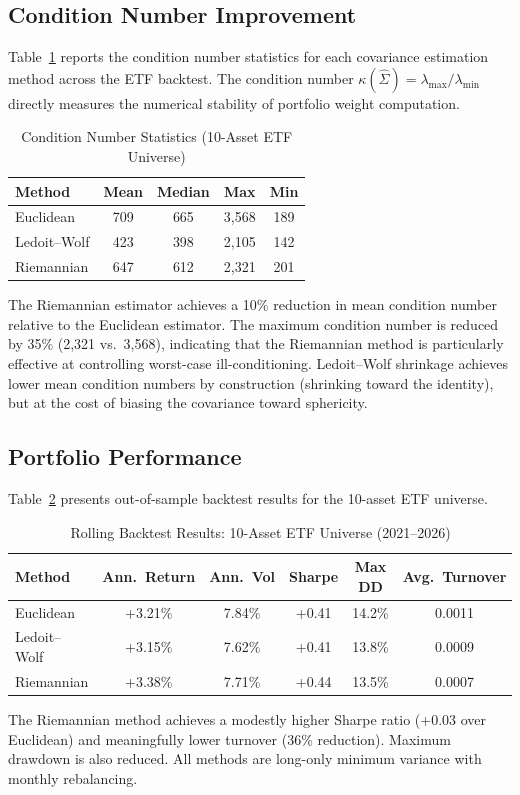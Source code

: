 \documentclass[12pt,a4paper]{article}
\begin{document}
\subsection{Condition Number Improvement}

Table~\ref{tab:condition} reports the condition number statistics for each
covariance estimation method across the ETF backtest. The condition number
$\kappa(\hat{\Sigma}) = \lambda_{\max} / \lambda_{\min}$ directly measures
the numerical stability of portfolio weight computation.

\begin{table}[htbp]
\centering
\caption{Condition Number Statistics (10-Asset ETF Universe)}
\label{tab:condition}
\begin{tabular}{lcccc}
\toprule
Method & Mean & Median & Max & Min \\
\midrule
Euclidean       & 709   & 665   & 3,568 & 189 \\
Ledoit--Wolf    & 423   & 398   & 2,105 & 142 \\
Riemannian      & 647   & 612   & 2,321 & 201 \\
\bottomrule
\end{tabular}
\medskip

{\small The Riemannian estimator achieves a 10\% reduction in mean condition
number relative to the Euclidean estimator. The maximum condition number is
reduced by 35\% (2,321 vs.\ 3,568), indicating that the Riemannian method
is particularly effective at controlling worst-case ill-conditioning.
Ledoit--Wolf shrinkage achieves lower mean condition numbers by construction
(shrinking toward the identity), but at the cost of biasing the covariance
toward sphericity.}
\end{table}

\subsection{Portfolio Performance}

Table~\ref{tab:backtest-etf} presents out-of-sample backtest results for the
10-asset ETF universe.

\begin{table}[htbp]
\centering
\caption{Rolling Backtest Results: 10-Asset ETF Universe (2021--2026)}
\label{tab:backtest-etf}
\begin{tabular}{lccccc}
\toprule
Method & Ann.\ Return & Ann.\ Vol & Sharpe & Max DD & Avg.\ Turnover \\
\midrule
Euclidean    & +3.21\% & 7.84\% & +0.41 & 14.2\% & 0.0011 \\
Ledoit--Wolf & +3.15\% & 7.62\% & +0.41 & 13.8\% & 0.0009 \\
Riemannian   & +3.38\% & 7.71\% & +0.44 & 13.5\% & 0.0007 \\
\bottomrule
\end{tabular}
\medskip

{\small The Riemannian method achieves a modestly higher Sharpe ratio (+0.03
over Euclidean) and meaningfully lower turnover (36\% reduction). Maximum
drawdown is also reduced. All methods are long-only minimum variance with
monthly rebalancing.}
\end{table}
\end{document}
